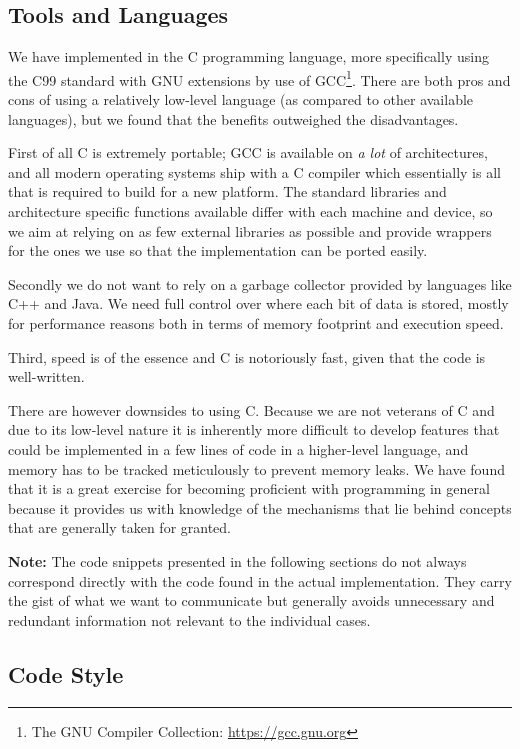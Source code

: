 \subsection{Tools and Languages}

We have implemented \thename{} in the C programming language, more specifically
using the C99 standard with GNU extensions by use of GCC\footnote{The GNU
  Compiler Collection: \url{https://gcc.gnu.org}}. There are both pros and cons
of using a relatively low-level language (as compared to other available
languages), but we found that the benefits outweighed the disadvantages.

First of all C is extremely portable; GCC is available on \textit{a lot} of
architectures, and all modern operating systems ship with a C compiler which
essentially is all that is required to build \thename{} for a new platform. The
standard libraries and architecture specific functions available differ with
each machine and device, so we aim at relying on as few external libraries as
possible and provide wrappers for the ones we use so that the implementation can
be ported easily.

Secondly we do not want to rely on a garbage collector provided by languages
like C++ and Java. We need full control over where each bit of data is stored,
mostly for performance reasons both in terms of memory footprint and execution
speed.

Third, speed is of the essence and C is notoriously fast, given that the code is
well-written.

There are however downsides to using C. Because we are not veterans of C and due
to its low-level nature it is inherently more difficult to develop features that
could be implemented in a few lines of code in a higher-level language, and
memory has to be tracked meticulously to prevent memory leaks. We have found
that it is a great exercise for becoming proficient with programming in general
because it provides us with knowledge of the mechanisms that lie behind concepts
that are generally taken for granted.

\textbf{Note:} The code snippets presented in the following sections do not
always correspond directly with the code found in the actual
implementation. They carry the gist of what we want to communicate but generally
avoids unnecessary and redundant information not relevant to the individual
cases.

\subsection{Code Style}

